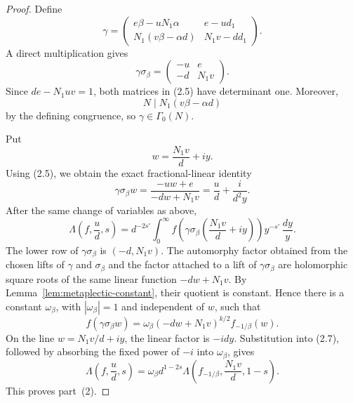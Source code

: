 \documentclass[11pt]{amsart}
\theoremstyle{remark}
\begin{document}
\begin{proof}
Define
\[
\gamma=
\begin{pmatrix}
e\beta-uN_1\alpha&e-ud_1\\
N_1(v\beta-\alpha d)&N_1v-dd_1
\end{pmatrix}.
\]
A direct multiplication gives
\[
\gamma\sigma_\beta=
\begin{pmatrix}-u&e\\-d&N_1v\end{pmatrix}.
\tag{2.5}
\]
Since $de-N_1uv=1$, both matrices in (2.5) have determinant one. Moreover,
\[
N\mid N_1(v\beta-\alpha d)
\]
by the defining congruence, so $\gamma\in\Gamma_0(N)$.

Put
\[
w=\frac{N_1v}{d}+iy.
\]
Using (2.5), we obtain the exact fractional-linear identity
\[
\gamma\sigma_\beta w
=\frac{-u w+e}{-d w+N_1v}
=\frac ud+\frac{i}{d^2y}.
\tag{2.6}
\]
After the same change of variables as above,
\[
\Lambda\left(f,\frac ud,s\right)
=d^{-2s'}\int_0^\infty
f\left(\gamma\sigma_\beta
\left(\frac{N_1v}{d}+iy\right)\right)
y^{-s'}\,\frac{dy}{y}.
\tag{2.7}
\]
The lower row of $\gamma\sigma_\beta$ is $(-d,N_1v)$. The automorphy
factor obtained from the chosen lifts of $\gamma$ and $\sigma_\beta$ and
the factor attached to a lift of $\gamma\sigma_\beta$ are holomorphic
square roots of the same linear function $-d w+N_1v$. By
Lemma~\ref{lem:metaplectic-constant}, their quotient is constant. Hence
there is a constant $\omega_\beta$, with $|\omega_\beta|=1$ and independent
of $w$, such that
\[
f(\gamma\sigma_\beta w)
=\omega_\beta(-d w+N_1v)^{k/2}f_{-1/\beta}(w).
\]
On the line $w=N_1v/d+iy$, the linear factor is $-idy$. Substitution into
(2.7), followed by absorbing the fixed power of $-i$ into $\omega_\beta$,
gives
\[
\Lambda\left(f,\frac ud,s\right)
=\omega_\beta d^{1-2s}
\Lambda\left(f_{-1/\beta},\frac{N_1v}{d},1-s\right).
\]
This proves part~\textup{(2)}.
\end{proof}
\end{document}
